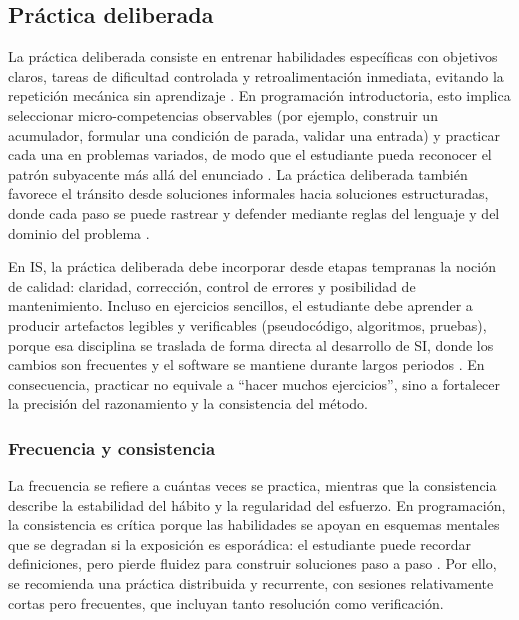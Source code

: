 \documentclass[12pt,twoside]{book}
\begin{document}
				\subsection{Práctica deliberada}
					\noindent
					La práctica deliberada consiste en entrenar habilidades específicas con objetivos claros, tareas de dificultad controlada y retroalimentación inmediata, evitando la repetición mecánica sin aprendizaje \cite{SWEBOK2025Guide,Gaddis2022Starting}. En programación introductoria, esto implica seleccionar micro-competencias observables (por ejemplo, construir un acumulador, formular una condición de parada, validar una entrada) y practicar cada una en problemas variados, de modo que el estudiante pueda reconocer el patrón subyacente más allá del enunciado \cite{Farrell2018Programming,Joyanes2007Fundamentos}. La práctica deliberada también favorece el tránsito desde soluciones informales hacia soluciones estructuradas, donde cada paso se puede rastrear y defender mediante reglas del lenguaje y del dominio del problema \cite{Cormen2022Introduction,Pressman2019Software}.
					
					En IS, la práctica deliberada debe incorporar desde etapas tempranas la noción de calidad: claridad, corrección, control de errores y posibilidad de mantenimiento. Incluso en ejercicios sencillos, el estudiante debe aprender a producir artefactos legibles y verificables (pseudocódigo, algoritmos, pruebas), porque esa disciplina se traslada de forma directa al desarrollo de SI, donde los cambios son frecuentes y el software se mantiene durante largos periodos \cite{Sommerville2015Software,Abid2020Years,Lima2023Software}. En consecuencia, practicar no equivale a “hacer muchos ejercicios”, sino a fortalecer la precisión del razonamiento y la consistencia del método.
					
					\subsubsection{Frecuencia y consistencia}
						\noindent
						La frecuencia se refiere a cuántas veces se practica, mientras que la consistencia describe la estabilidad del hábito y la regularidad del esfuerzo. En programación, la consistencia es crítica porque las habilidades se apoyan en esquemas mentales que se degradan si la exposición es esporádica: el estudiante puede recordar definiciones, pero pierde fluidez para construir soluciones paso a paso \cite{Gaddis2022Starting,Farrell2018Programming}. Por ello, se recomienda una práctica distribuida y recurrente, con sesiones relativamente cortas pero frecuentes, que incluyan tanto resolución como verificación.
						
\end{document}
